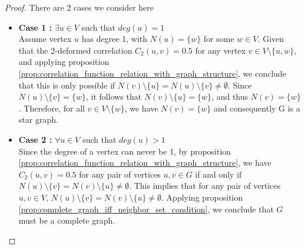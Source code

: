 \documentclass{article}
\begin{document}
\begin{proof}
There are 2 cases we consider here 
\begin{itemize}
    \item \textbf{Case 1 :} $\exists u \in V$ such that $deg(u) = 1$ \\
    Assume vertex $ u $ has degree 1, with $ N(u) = \{w\} $ for some $ w \in V $. Given that the 2-deformed correlation $ C_2(u, v) = 0.5 $ for any vertex $ v \in V \setminus \{u, w\} $, and applying proposition \eqref{prop:correlation_function_relation_with_graph_structure}, we conclude that this is only possible if $ N(v) \setminus \{u\} = N(u) \setminus \{v\} \neq \emptyset $. Since $ N(u) \setminus \{v\} = \{w\} $, it follows that $ N(v) \setminus \{u\} = \{w\} $, and thus $ N(v) = \{w\} $. Therefore, for all $ v \in V \setminus \{w\} $, we have $ N(v) = \{w\} $ and consequently G is a star graph.
     \item \textbf{Case 2 :} $\forall u \in V$ such that $deg(u) > 1$ \\
    Since the degree of a vertex can never be 1, by proposition \eqref{prop:correlation_function_relation_with_graph_structure}, we have $ C_2(u, v) = 0.5 $ for any pair of vertices $ u, v \in G $ if and only if $ N(u) \setminus \{v\} = N(v) \setminus \{u\} \neq \emptyset $. This implies that for any pair of vertices $ u, v \in V $, $ N(u) \setminus \{v\} = N(v) \setminus \{u\} \neq \emptyset $. Applying  proposition \ref{prop:complete_graph_iff_neighbor_set_condition}, we conclude that $ G $ must be a complete graph.
\end{itemize}
\end{proof}
\end{document}
